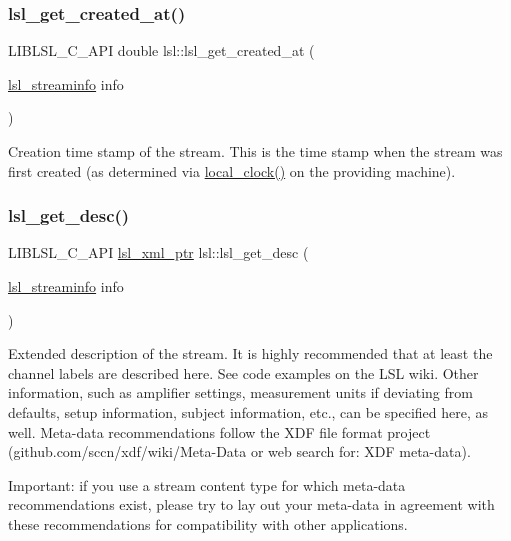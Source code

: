 \subsubsection{\texorpdfstring{lsl\+\_\+get\+\_\+created\+\_\+at()}{lsl\_get\_created\_at()}}
{\footnotesize\ttfamily L\+I\+B\+L\+S\+L\+\_\+\+C\+\_\+\+A\+PI double lsl\+::lsl\+\_\+get\+\_\+created\+\_\+at (\begin{DoxyParamCaption}\item[{\hyperlink{namespacelsl_aa0a9ce9956061679949daa2e35aae2e8}{lsl\+\_\+streaminfo}}]{info }\end{DoxyParamCaption})}

Creation time stamp of the stream. This is the time stamp when the stream was first created (as determined via \hyperlink{namespacelsl_ae1766ae2ab66141cb927612e57a0c8c6}{local\+\_\+clock()} on the providing machine). \mbox{\label{namespacelsl_aeb428e46e46db8bd534e45ed8a76a120}} 
\subsubsection{\texorpdfstring{lsl\+\_\+get\+\_\+desc()}{lsl\_get\_desc()}}
{\footnotesize\ttfamily L\+I\+B\+L\+S\+L\+\_\+\+C\+\_\+\+A\+PI \hyperlink{namespacelsl_a5edc7a49a1a1be1634fe6dce3d59c59b}{lsl\+\_\+xml\+\_\+ptr} lsl\+::lsl\+\_\+get\+\_\+desc (\begin{DoxyParamCaption}\item[{\hyperlink{namespacelsl_aa0a9ce9956061679949daa2e35aae2e8}{lsl\+\_\+streaminfo}}]{info }\end{DoxyParamCaption})}

Extended description of the stream. It is highly recommended that at least the channel labels are described here. See code examples on the L\+SL wiki. Other information, such as amplifier settings, measurement units if deviating from defaults, setup information, subject information, etc., can be specified here, as well. Meta-\/data recommendations follow the X\+DF file format project (github.\+com/sccn/xdf/wiki/\+Meta-\/\+Data or web search for\+: X\+DF meta-\/data).

Important\+: if you use a stream content type for which meta-\/data recommendations exist, please try to lay out your meta-\/data in agreement with these recommendations for compatibility with other applications. \mbox{\label{namespacelsl_a6a303d699340f95ed7b68d7bf129fd45}} 

